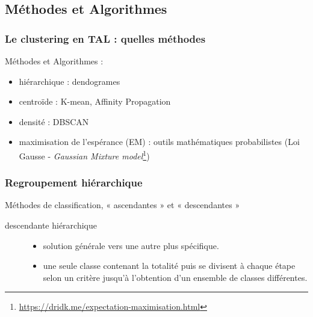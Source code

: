 \subsection{Méthodes et Algorithmes}
\begin{frame}
  \frametitle{Le clustering en TAL : quelles méthodes}
 Méthodes et Algorithmes :
  \begin{itemize}
  \item {} hiérarchique : dendogrames
  \item {} centroïde : K-mean, Affinity Propagation
  \item {} densité : DBSCAN
  \item {} maximisation de l’espérance (EM) : outils mathématiques probabilistes (Loi Gausse - \textit{Gaussian Mixture model}\footnote{\url{https://dridk.me/expectation-maximisation.html}})
  \end{itemize}
  

  
\end{frame}

\begin{frame}
  \frametitle{Regroupement hiérarchique}
  
  Méthodes de classification, « ascendantes » et « descendantes »
\begin{description}
\item  [descendante hiérarchique] 
\begin{itemize}
\item {} solution générale vers une autre plus spécifique.
\item {} une seule classe contenant la totalité puis se divisent à chaque étape selon un critère jusqu’à l’obtention d’un ensemble de classes différentes.
\end{itemize}
\end{description} 
\end{frame}

